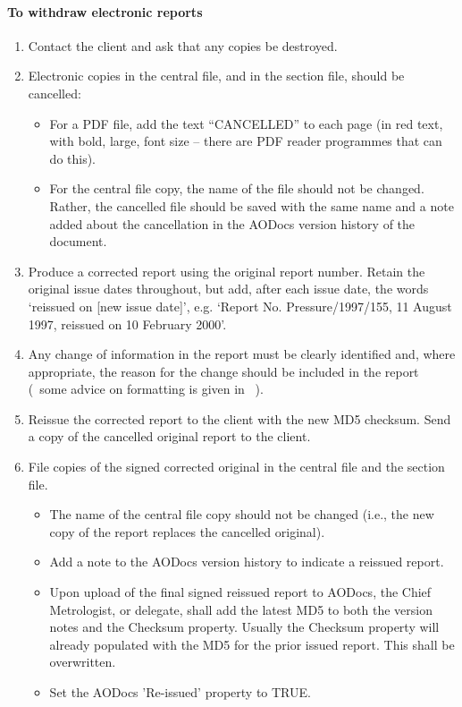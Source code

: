 \paragraph{To withdraw electronic reports}
\begin{enumerate}
\item Contact the client and ask that any copies be destroyed. 

\item Electronic copies in the central file, and in the section file, should be cancelled:
\begin{itemize}
\item For a PDF file, add the text “{\color{red}CANCELLED}” to each page (in red text, with bold, large, font size – there are PDF reader programmes that can do this). 
\item For the central file copy, the name of the file should not be changed. Rather, the cancelled file should be saved with the same name and a note added about the cancellation in the AODocs version history of the document. 
\end{itemize}

\item Produce a corrected report using the original report number.  Retain the original issue dates throughout, but add, after each issue date, the words `reissued on [new issue date]', e.g. `Report No. Pressure/1997/155, 11 August 1997, reissued on 10 February 2000'.

\item Any change of information in the report must be clearly identified and, where appropriate, the reason for the change should be included in the report (~some advice on formatting is given in \cite[\S\ref*{GRP-ss:reissued_reports}]{MSL_Reporting_Guidelines}~).

\item Reissue the corrected report to the client with the new MD5 checksum. Send a copy of the cancelled original report to the client. 

\item File copies of the signed corrected original in the central file and the section file. 
\begin{itemize}
\item The name of the central file copy should not be changed (i.e., the new copy of the report replaces the cancelled original). 
\item Add a note to the AODocs version history to indicate a reissued report.
\item Upon upload of the final signed reissued report to AODocs, the Chief Metrologist, or delegate, shall add the latest MD5 to both the version notes and the Checksum property. Usually the Checksum property will already populated with the MD5 for the prior issued report. This shall be overwritten.
\item Set the AODocs 'Re-issued' property to TRUE.
\end{itemize}
\end{enumerate}

